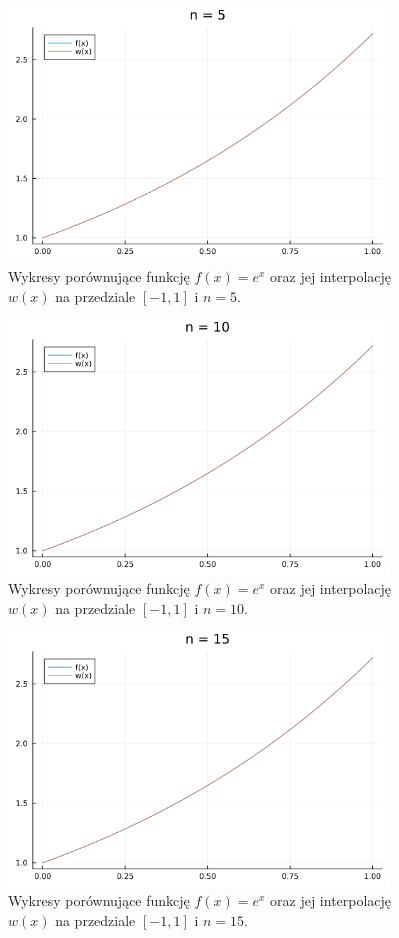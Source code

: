 \documentclass{article}
\begin{document}
\begin{figure}[H]
    \centering
    \includegraphics[width=0.9\textwidth]{../plots/ex4_1_n5.png}
    \caption{Wykresy porównujące funkcję $f(x) = e^x$ oraz jej interpolację $w(x)$ na przedziale $[-1, 1]$ i $n=5$.}
\end{figure}
\begin{figure}[H]
    \centering
    \includegraphics[width=0.9\textwidth]{../plots/ex4_1_n10.png}
    \caption{Wykresy porównujące funkcję $f(x) = e^x$ oraz jej interpolację $w(x)$ na przedziale $[-1, 1]$ i $n=10$.}
\end{figure}
\begin{figure}[H]
    \centering
    \includegraphics[width=0.9\textwidth]{../plots/ex4_1_n15.png}
    \caption{Wykresy porównujące funkcję $f(x) = e^x$ oraz jej interpolację $w(x)$ na przedziale $[-1, 1]$ i $n=15$.}
\end{figure}
\end{document}
